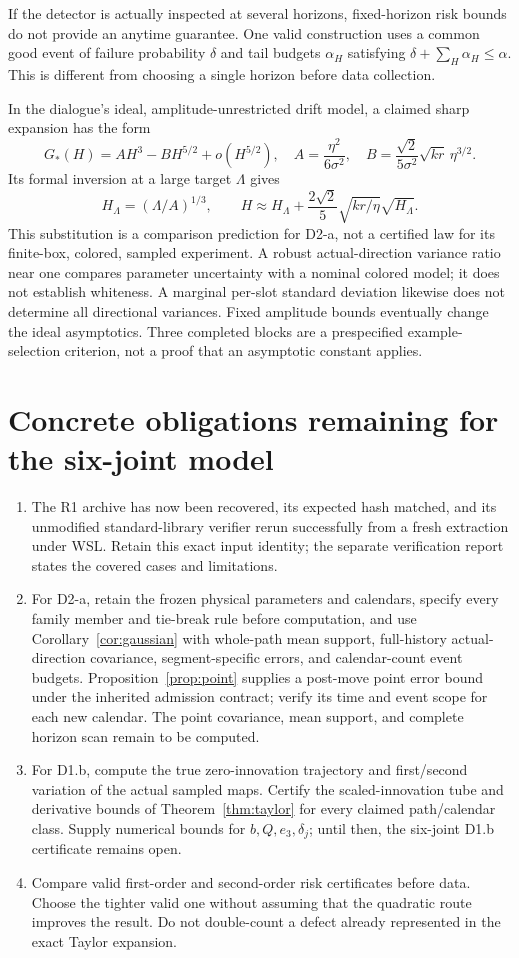 \documentclass[11pt]{article}
\theoremstyle{remark}\newtheorem{remark}[theorem]{Remark}
\begin{document}
If the detector is actually inspected at several horizons, fixed-horizon risk bounds do not provide an anytime guarantee. One valid construction uses a common good event of failure probability $\delta$ and tail budgets $\alpha_H$ satisfying $\delta+\sum_H\alpha_H\le\alpha$. This is different from choosing a single horizon before data collection.

In the dialogue's ideal, amplitude-unrestricted drift model, a claimed sharp expansion has the form
\[
 G_*(H)=A H^3-BH^{5/2}+o(H^{5/2}),\quad
 A=\frac{\eta^2}{6\sigma^2},\quad
 B=\frac{\sqrt2}{5\sigma^2}\sqrt{kr}\,\eta^{3/2}.
\]
Its formal inversion at a large target $\Lambda$ gives
\[
 H_\Lambda=(\Lambda/A)^{1/3},\qquad
 H\approx H_\Lambda+\frac{2\sqrt2}{5}
                  \sqrt{kr/\eta}\sqrt{H_\Lambda}.
\]
This substitution is a comparison prediction for D2-a, not a certified law for its finite-box, colored, sampled experiment. A robust actual-direction variance ratio near one compares parameter uncertainty with a nominal colored model; it does not establish whiteness. A marginal per-slot standard deviation likewise does not determine all directional variances. Fixed amplitude bounds eventually change the ideal asymptotics. Three completed blocks are a prespecified example-selection criterion, not a proof that an asymptotic constant applies.

\section{Concrete obligations remaining for the six-joint model}
\begin{enumerate}
\item The R1 archive has now been recovered, its expected hash matched, and its unmodified standard-library verifier rerun successfully from a fresh extraction under WSL. Retain this exact input identity; the separate verification report states the covered cases and limitations.
\item For D2-a, retain the frozen physical parameters and calendars, specify every family member and tie-break rule before computation, and use Corollary~\ref{cor:gaussian} with whole-path mean support, full-history actual-direction covariance, segment-specific errors, and calendar-count event budgets. Proposition~\ref{prop:point} supplies a post-move point error bound under the inherited admission contract; verify its time and event scope for each new calendar. The point covariance, mean support, and complete horizon scan remain to be computed.
\item For D1.b, compute the true zero-innovation trajectory and first/second variation of the actual sampled maps. Certify the scaled-innovation tube and derivative bounds of Theorem~\ref{thm:taylor} for every claimed path/calendar class. Supply numerical bounds for $b,Q,e_3,\delta_j$; until then, the six-joint D1.b certificate remains open.
\item Compare valid first-order and second-order risk certificates before data. Choose the tighter valid one without assuming that the quadratic route improves the result. Do not double-count a defect already represented in the exact Taylor expansion.
\end{enumerate}
\end{document}
